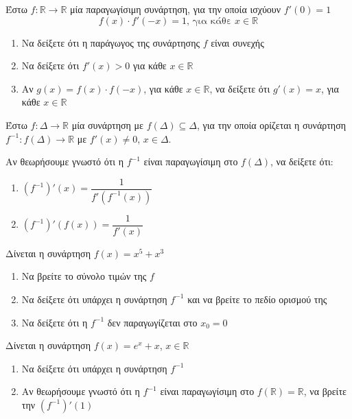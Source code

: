 \documentclass{presentation}
\begin{document}
\begin{askisi}
    Έστω $f:\mathbb{R}\to\mathbb{R}$ μία παραγωγίσιμη συνάρτηση, για την οποία ισχύουν $f'(0)=1$
    $$f(x)\cdot f'(-x)=1 \text{, για κάθε } x\in\mathbb{R}$$
    \begin{enumerate}
        \item<1-> Να δείξετε ότι η παράγωγος της συνάρτησης $f$ είναι συνεχής
        \item<2-> Να δείξετε ότι $f'(x)>0$ για κάθε $x\in\mathbb{R}$
        \item<3-> Αν $g(x)=f(x)\cdot f(-x)$, για κάθε $x\in\mathbb{R}$, να δείξετε ότι $g'(x)=x$, για κάθε $x\in\mathbb{R}$
    \end{enumerate}

\end{askisi}

\begin{askisi}
    Έστω $f:Δ\to\mathbb{R}$ μία συνάρτηση με $f(Δ)\subseteq Δ$, για την οποία ορίζεται η συνάρτηση $f^{-1}:f(Δ)\to\mathbb{R}$ με $f'(x)\ne 0$, $x\in Δ$.

    Αν θεωρήσουμε γνωστό ότι η $f^{-1}$ είναι παραγωγίσιμη στο $f(Δ)$, να δείξετε ότι:
    \begin{enumerate}
        \item<1-> $(f^{-1})'(x)=\dfrac{1}{f'(f^{-1}(x))}$
        \item<2-> $(f^{-1})'(f(x))=\dfrac{1}{f'(x)}$
    \end{enumerate}

\end{askisi}

\begin{askisi}
    Δίνεται η συνάρτηση $f(x)=x^5+x^3$
    \begin{enumerate}
        \item<1-> Να βρείτε το σύνολο τιμών της $f$
        \item<2-> Να δείξετε ότι υπάρχει η συνάρτηση $f^{-1}$ και να βρείτε το πεδίο ορισμού της
        \item<3-> Να δείξετε ότι η $f^{-1}$ δεν παραγωγίζεται στο $x_0=0$
    \end{enumerate}

\end{askisi}

\begin{askisi}
    Δίνεται η συνάρτηση $f(x)=e^x+x$, $x\in\mathbb{R}$
    \begin{enumerate}
        \item<1-> Να δείξετε ότι υπάρχει η συνάρτηση $f^{-1}$
        \item<2-> Αν θεωρήσουμε γνωστό ότι η $f^{-1}$ είναι παραγωγίσιμη στο $f(\mathbb{R})=\mathbb{R}$, να βρείτε την $(f^{-1})'(1)$
    \end{enumerate}

\end{askisi}
\end{document}
